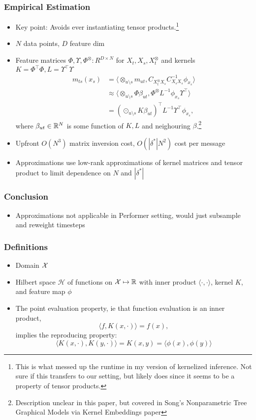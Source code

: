 \documentclass{beamer}
\begin{document}
\begin{frame}
\frametitle{Empirical Estimation}
\begin{itemize}
\item Key point: Avoids ever instantiating tensor products.\footnote{This is what messed up the runtime
    in my version of kernelized inference. Not sure if this transfers to our setting,
    but likely does since it seems to be a property of tensor products.}
\item $N$ data points, $D$ feature dim
\item Feature matrices
$\Phi, \Upsilon, \Phi^\otimes: R^{D \times N}$ for $X_t, X_s, X_t^\otimes$
and kernels $K = \Phi^\top\Phi, L = \Upsilon^\top\Upsilon$
\begin{align*}
m_{ts}(x_s)
&= \langle \otimes_{u\setminus s} m_{ut}, C_{X_t^\otimes X_s}C_{X_sX_s}^{-1}\phi_{x_s}\rangle\\
&\approx \langle \otimes_{u\setminus s} \Phi\beta_{ut},
    \Phi^\otimes L^{-1}\phi_{x_s}\Upsilon^\top\rangle\\
&= (\odot_{u\setminus s} K\beta_{ut})^\top L^{-1}\Upsilon^\top\phi_{x_s},
\end{align*}
where $\beta_{ut}\in\mathbb{R}^N$ is some function of $K,L$ and neighouring $\beta$.\footnote{
Description unclear in this paper, but covered in Song's Nonparametric Tree Graphical Models via 
Kernel Embeddings paper}
\item Upfront $O(N^3)$ matrix inversion cost, $O(|\delta^*|N^2)$ cost per message
\item Approximations use low-rank approximations of kernel matrices and tensor product
to limit dependence on $N$ and $|\delta^*|$
\end{itemize}
\end{frame}

\begin{frame}
\frametitle{Conclusion}
\begin{itemize}
\item Approximations not applicable in Performer setting,
    would just subsample and reweight timesteps
\end{itemize}
\end{frame}

\begin{frame}
\frametitle{Definitions}
\begin{itemize}
\item Domain $\mathcal{X}$
\vspace{1em}
\item Hilbert space $\mathscr{H}$ of functions on $\mathcal{X}\mapsto\mathbb{R}$
    with inner product $\langle\cdot,\cdot\rangle$, kernel $K$,
    and feature map $\phi$
\vspace{1em}
\item The point evaluation property, 
ie that function evaluation is an inner product,
$$\langle f, K(x, \cdot) \rangle = f(x),$$
implies the reproducing property:
$$ \langle K(x,\cdot), K(y, \cdot) \rangle = K(x,y) = \langle \phi(x), \phi(y) \rangle$$
\end{itemize}
\end{frame}
\end{document}

